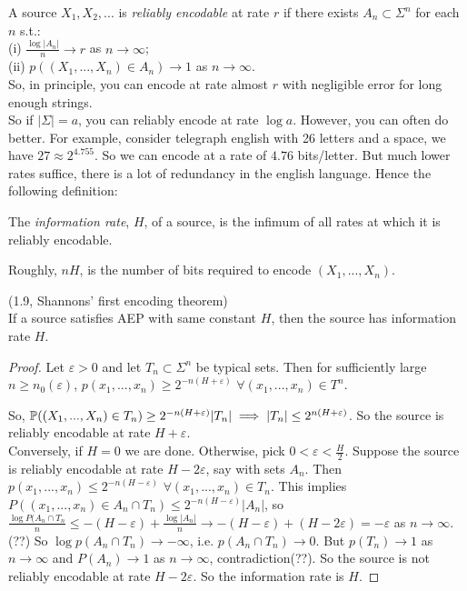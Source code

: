 \documentclass[a4paper]{article}
\begin{document}
\begin{defi}
A source $X_1,X_2,...$ is \emph{reliably encodable} at rate $r$ if there exists $A_n \subset \Sigma^n$ for each $n$ s.t.:\\
(i) $\frac{\log|A_n|}{n} \to r$ as $n \to \infty$;\\
(ii) $p((X_1,...,X_n) \in A_n) \to 1$ as $n \to \infty$.\\
So, in principle, you can encode at rate almost $r$ with negligible error for long enough strings.\\
So if $|\Sigma|=a$, you can reliably encode at rate $\log a$. However, you can often do better. For example, consider telegraph english with 26 letters and a space, we have $27 \approx 2^{4.755}$. So we can encode at a rate of $4.76$ bits/letter. But much lower rates suffice, there is a lot of redundancy in the english language. Hence the following definition:\\
\end{defi}

\begin{defi}
The \emph{information rate}, $H$, of a source, is the infimum of all rates at which it is reliably encodable.
\end{defi}

Roughly, $nH$, is the number of bits required to encode $(X_1,...,X_n)$.

\begin{thm} (1.9, Shannons' first encoding theorem)\\
If a source satisfies AEP with same constant $H$, then the source has information rate $H$.
\begin{proof}
Let $\varepsilon > 0$ and let $T_n \subset \Sigma^n$ be typical sets. Then for sufficiently large $n \geq n_0 (\varepsilon)$, $p(x_1,...,x_n) \geq 2^{-n(H+\varepsilon)}$ $\forall (x_1,...,x_n) \in T^n$.

So, $\P((X_1,...,X_n) \in T_n) \geq 2^{-n(H+\varepsilon)} |T_n| \implies |T_n| \leq 2^{n(H+\varepsilon)}$. So the source is reliably encodable at rate $H+\varepsilon$.\\
Conversely, if $H=0$ we are done. Otherwise, pick $0 < \varepsilon < \frac{H}{2}$. Suppose the source is reliably encodable at rate $H-2\varepsilon$, say with sets $A_n$. Then $p(x_1,...,x_n) \leq 2^{-n(H-\varepsilon)}$ $\forall (x_1,...,x_n) \in T_n$. This implies $P((x_1,...,x_n) \in A_n \cap T_n) \leq 2^{-n(H-\varepsilon)}|A_n|$, so $\frac{\log P(A_n \cap T_n}{n} \leq -(H-\varepsilon) + \frac{\log |A_n|}{n} \to -(H-\varepsilon) + (H-2\varepsilon) = -\varepsilon$ as $n \to \infty$. (??) So $\log p(A_n \cap T_n) \to -\infty$, i.e. $p(A_n \cap T_n) \to 0$. But $p(T_n) \to 1$ as $n \to \infty$ and $P(A_n) \to 1$ as $n \to \infty$, contradiction(??). So the source is not reliably encodable at rate $H-2\varepsilon$. So the information rate is $H$.
\end{proof}
\end{thm}
\end{document}
